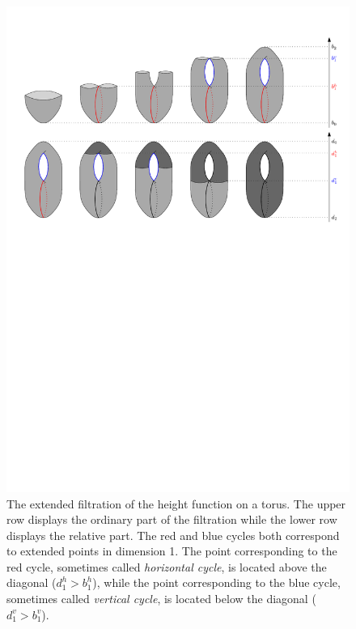 \begin{figure}[htb]
\begin{center}
\includegraphics[width=13cm]{figures/ExFilt}
\caption[Extended filtration]{\label{fig:ExFilt} The extended filtration of the
height function on a torus.  The upper row displays the ordinary
part of the filtration while the lower row displays the relative part.  
The red and blue cycles both correspond to
extended points in dimension 1.  The point corresponding to
the red cycle, sometimes called {\em horizontal cycle}, is located above 
the diagonal ($d_1^h>b_1^h$), while
the point corresponding to the blue cycle, sometimes called {\em vertical cycle},  
is located below the
diagonal ($d_1^v>b_1^v$).}
\end{center}
\end{figure}

